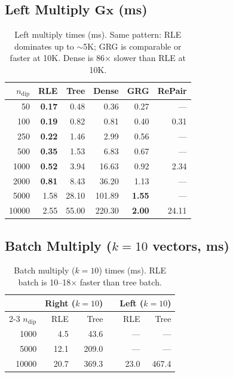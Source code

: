 \documentclass[11pt]{article}
\begin{document}
\subsection{Left Multiply $\mathbf{G} \mathbf{x}$ (ms)}

\begin{table}[h]
\centering
\begin{tabular}{r rrrrr}
\toprule
$n_\text{dip}$ & RLE & Tree & Dense & GRG & RePair \\
\midrule
50    & \textbf{0.17}  & 0.48  & 0.36  & 0.27  & ---   \\
100   & \textbf{0.19}  & 0.82  & 0.81  & 0.40  & 0.31  \\
250   & \textbf{0.22}  & 1.46  & 2.99  & 0.56  & ---   \\
500   & \textbf{0.35}  & 1.53  & 6.83  & 0.67  & ---   \\
1000  & \textbf{0.52}  & 3.94  & 16.63 & 0.92  & 2.34  \\
2000  & \textbf{0.81}  & 8.43  & 36.20 & 1.13  & ---   \\
5000  & 1.58  & 28.10 & 101.89& \textbf{1.55}  & ---   \\
10000 & 2.55  & 55.00 & 220.30& \textbf{2.00}  & 24.11 \\
\bottomrule
\end{tabular}
\caption{Left multiply times (ms).  Same pattern: RLE dominates up to
$\sim$5K; GRG is comparable or faster at 10K.  Dense is 86$\times$ slower
than RLE at 10K.}
\label{tab:left}
\end{table}

\subsection{Batch Multiply ($k = 10$ vectors, ms)}

\begin{table}[h]
\centering
\begin{tabular}{r rr c rr}
\toprule
& \multicolumn{2}{c}{Right ($k{=}10$)} && \multicolumn{2}{c}{Left ($k{=}10$)} \\
\cmidrule{2-3} \cmidrule{5-6}
$n_\text{dip}$ & RLE & Tree && RLE & Tree \\
\midrule
1000  & 4.5  & 43.6  && ---  & ---  \\
5000  & 12.1 & 209.0 && ---  & ---  \\
10000 & 20.7 & 369.3 && 23.0 & 467.4\\
\bottomrule
\end{tabular}
\caption{Batch multiply ($k = 10$) times (ms).  RLE batch is
10--18$\times$ faster than tree batch.}
\label{tab:batch}
\end{table}
\end{document}
